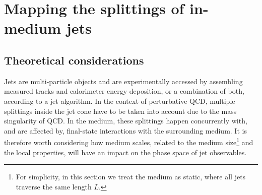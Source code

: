 
\section{Mapping the splittings of in-medium jets}
\label{sec:phasespace}


\subsection{Theoretical considerations}
\label{sec:phasespace-theory}


Jets are multi-particle objects and are experimentally accessed by assembling measured tracks and calorimeter energy deposition, or a combination of both, according to a jet algorithm. In the context of perturbative QCD, multiple splittings inside the jet cone have to be taken into account due to the mass singularity of QCD. 
In the medium, these splittings happen concurrently with, and are affected by, final-state interactions with the surrounding medium. It is therefore worth considering how medium scales, related to the medium size\footnote{For simplicity, in this section we treat the medium as static, where all jets traverse the same length $L$.} and the local properties, will have an impact on the phase space of jet observables. 

